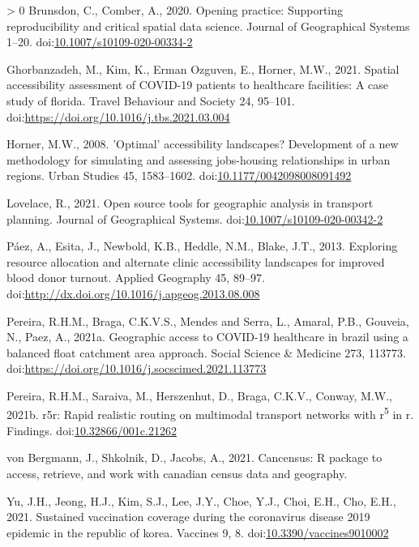 \documentclass[]{elsarticle} %
\newlength{\cslhangindent}
\newenvironment{CSLReferences}[3] %
 {%
  \setlength{\parindent}{0pt}
  \ifodd #1 \everypar{\setlength{\hangindent}{\cslhangindent}}\ignorespaces\fi
  \ifnum #2 > 0
  \setlength{\parskip}{#2\baselineskip}
  \fi
 }%
 {}
\begin{document}
\hypertarget{refs}{}
\begin{CSLReferences}{1}{0}
\leavevmode\hypertarget{ref-Brunsdon2020opening}{}%
Brunsdon, C., Comber, A., 2020. Opening practice: Supporting
reproducibility and critical spatial data science. Journal of
Geographical Systems 1--20.
doi:\href{https://doi.org/10.1007/s10109-020-00334-2}{10.1007/s10109-020-00334-2}

\leavevmode\hypertarget{ref-Ghorbanzadeh2021spatial}{}%
Ghorbanzadeh, M., Kim, K., Erman Ozguven, E., Horner, M.W., 2021.
Spatial accessibility assessment of COVID-19 patients to healthcare
facilities: A case study of florida. Travel Behaviour and Society 24,
95--101. doi:\url{https://doi.org/10.1016/j.tbs.2021.03.004}

\leavevmode\hypertarget{ref-Horner2008optimal}{}%
Horner, M.W., 2008. 'Optimal' accessibility landscapes? Development of a
new methodology for simulating and assessing jobs-housing relationships
in urban regions. Urban Studies 45, 1583--1602.
doi:\href{https://doi.org/10.1177/0042098008091492}{10.1177/0042098008091492}

\leavevmode\hypertarget{ref-Lovelace2021open}{}%
Lovelace, R., 2021. Open source tools for geographic analysis in
transport planning. Journal of Geographical Systems.
doi:\href{https://doi.org/10.1007/s10109-020-00342-2}{10.1007/s10109-020-00342-2}

\leavevmode\hypertarget{ref-Paez2013exploring}{}%
Páez, A., Esita, J., Newbold, K.B., Heddle, N.M., Blake, J.T., 2013.
Exploring resource allocation and alternate clinic accessibility
landscapes for improved blood donor turnout. Applied Geography 45,
89--97. doi:\url{http://dx.doi.org/10.1016/j.apgeog.2013.08.008}

\leavevmode\hypertarget{ref-Pereira2021geographic}{}%
Pereira, R.H.M., Braga, C.K.V.S., Mendes and Serra, L., Amaral, P.B.,
Gouveia, N., Paez, A., 2021a. Geographic access to COVID-19 healthcare
in brazil using a balanced float catchment area approach. Social Science
\& Medicine 273, 113773.
doi:\url{https://doi.org/10.1016/j.socscimed.2021.113773}

\leavevmode\hypertarget{ref-Pereira2021r5r}{}%
Pereira, R.H.M., Saraiva, M., Herszenhut, D., Braga, C.K.V., Conway,
M.W., 2021b. r5r: Rapid realistic routing on multimodal transport
networks with r\textsuperscript{5} in r. Findings.
doi:\href{https://doi.org/10.32866/001c.21262}{10.32866/001c.21262}

\leavevmode\hypertarget{ref-vonBergmann2021cancensus}{}%
von Bergmann, J., Shkolnik, D., Jacobs, A., 2021. Cancensus: R package
to access, retrieve, and work with canadian census data and geography.

\leavevmode\hypertarget{ref-Yu2021sustained}{}%
Yu, J.H., Jeong, H.J., Kim, S.J., Lee, J.Y., Choe, Y.J., Choi, E.H.,
Cho, E.H., 2021. Sustained vaccination coverage during the coronavirus
disease 2019 epidemic in the republic of korea. Vaccines 9, 8.
doi:\href{https://doi.org/10.3390/vaccines9010002}{10.3390/vaccines9010002}

\end{CSLReferences}
\end{document}

